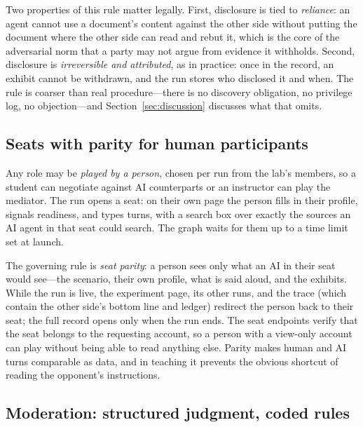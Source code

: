 \documentclass[acmsmall,screen,review]{acmart}
\begin{document}
Two properties of this rule matter legally. First, disclosure is tied to \emph{reliance}: an agent cannot use a document's content against the other side without putting the document where the other side can read and rebut it, which is the core of the adversarial norm that a party may not argue from evidence it withholds. Second, disclosure is \emph{irreversible and attributed}, as in practice: once in the record, an exhibit cannot be withdrawn, and the run stores who disclosed it and when. The rule is coarser than real procedure---there is no discovery obligation, no privilege log, no objection---and Section~\ref{sec:discussion} discusses what that omits.

\subsection{Seats with parity for human participants}
\label{sec:seats}

Any role may be \emph{played by a person}, chosen per run from the lab's members, so a student can negotiate against AI counterparts or an instructor can play the mediator. The run opens a seat: on their own page the person fills in their profile, signals readiness, and types turns, with a search box over exactly the sources an AI agent in that seat could search. The graph waits for them up to a time limit set at launch.

The governing rule is \emph{seat parity}: a person sees only what an AI in their seat would see---the scenario, their own profile, what is said aloud, and the exhibits. While the run is live, the experiment page, its other runs, and the trace (which contain the other side's bottom line and ledger) redirect the person back to their seat; the full record opens only when the run ends. The seat endpoints verify that the seat belongs to the requesting account, so a person with a view-only account can play without being able to read anything else. Parity makes human and AI turns comparable as data, and in teaching it prevents the obvious shortcut of reading the opponent's instructions.

\subsection{Moderation: structured judgment, coded rules}
\label{sec:moderation}
\end{document}
